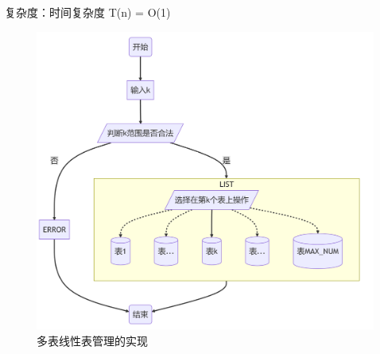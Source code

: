 \documentclass[supercite]{Experimental_Report}
\theoremstyle{definition}
\begin{document}
\begin{enumerate}
	复杂度：时间复杂度 T(n) = O(1)
	\begin{figure}[htbp]
	\centering
	\begin{minipage}{0.7\linewidth}
		\centering
		\includegraphics[width=0.9\linewidth]{images/多表管理.png}
	\end{minipage}
	\caption{多表线性表管理的实现}
	\label{fig1-7}
	\end{figure}
	\newpage
	
\end{enumerate}
\end{document}
